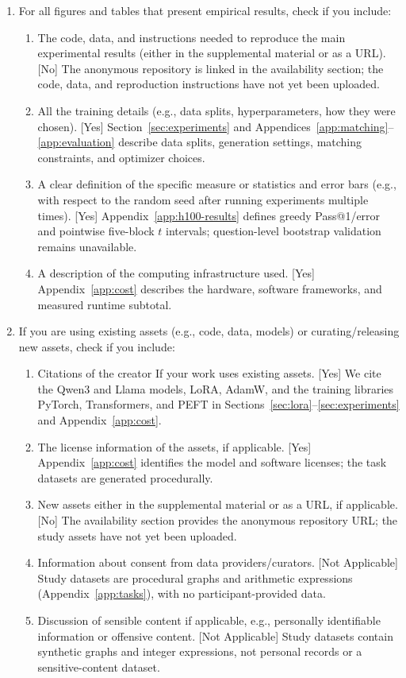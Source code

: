\begin{enumerate}
  \item For all figures and tables that present empirical results, check if you include:
  \begin{enumerate}
    \item The code, data, and instructions needed to reproduce the main experimental results (either in the supplemental material or as a URL). [No]
    The anonymous repository is linked in the availability section; the code, data, and reproduction instructions have not yet been uploaded.
    \item All the training details (e.g., data splits, hyperparameters, how they were chosen). [Yes]
    Section~\ref{sec:experiments} and Appendices~\ref{app:matching}--\ref{app:evaluation} describe data splits, generation settings, matching constraints, and optimizer choices.
    \item A clear definition of the specific measure or statistics and error bars (e.g., with respect to the random seed after running experiments multiple times). [Yes]
    Appendix~\ref{app:h100-results} defines greedy Pass@1/error and pointwise five-block $t$ intervals; question-level bootstrap validation remains unavailable.
    \item A description of the computing infrastructure used. [Yes]
    Appendix~\ref{app:cost} describes the hardware, software frameworks, and measured runtime subtotal.
  \end{enumerate}

  \item If you are using existing assets (e.g., code, data, models) or curating/releasing new assets, check if you include:
  \begin{enumerate}
    \item Citations of the creator If your work uses existing assets. [Yes]
    We cite the Qwen3 and Llama models, LoRA, AdamW, and the training libraries PyTorch, Transformers, and PEFT in Sections~\ref{sec:lora}--\ref{sec:experiments} and Appendix~\ref{app:cost}.
    \item The license information of the assets, if applicable. [Yes]
    Appendix~\ref{app:cost} identifies the model and software licenses; the task datasets are generated procedurally.
    \item New assets either in the supplemental material or as a URL, if applicable. [No]
    The availability section provides the anonymous repository URL; the study assets have not yet been uploaded.
    \item Information about consent from data providers/curators. [Not Applicable]
    Study datasets are procedural graphs and arithmetic expressions (Appendix~\ref{app:tasks}), with no participant-provided data.
    \item Discussion of sensible content if applicable, e.g., personally identifiable information or offensive content. [Not Applicable]
    Study datasets contain synthetic graphs and integer expressions, not personal records or a sensitive-content dataset.
  \end{enumerate}


\end{enumerate}
